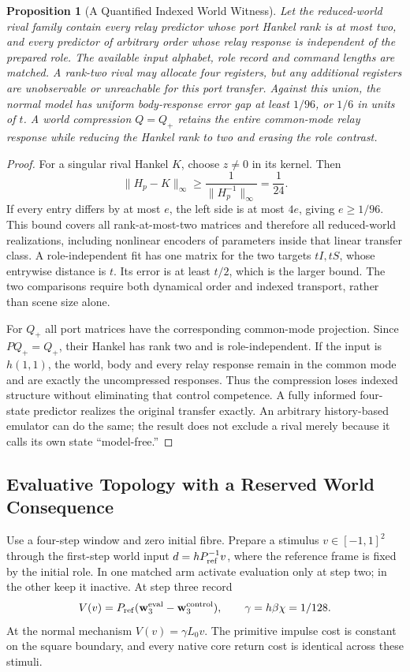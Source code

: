 \documentclass[11pt,a4paper]{article}
\newtheorem{proposition}[theorem]{Proposition}
\theoremstyle{definition}
\begin{document}
\begin{proposition}[A Quantified Indexed World Witness]\label{prop:bridge-indexed-world}
Let the reduced-world rival family contain every relay predictor whose port Hankel rank is at most two, and every predictor of arbitrary order whose relay response is independent of the prepared role. The available input alphabet, role record and command lengths are matched. A rank-two rival may allocate four registers, but any additional registers are unobservable or unreachable for this port transfer. Against this union, the normal model has uniform body-response error gap at least $1/96$, or $1/6$ in units of $t$. A world compression $Q=Q_+$ retains the entire common-mode relay response while reducing the Hankel rank to two and erasing the role contrast.
\end{proposition}
\begin{proof}
For a singular rival Hankel $K$, choose $z\ne0$ in its kernel. Then
\[
 \|H_p-K\|_\infty\ge\frac1{\|H_p^{-1}\|_\infty}=\frac1{24}.
\]
If every entry differs by at most $e$, the left side is at most $4e$, giving $e\ge1/96$. This bound covers all rank-at-most-two matrices and therefore all reduced-world realizations, including nonlinear encoders of parameters inside that linear transfer class. A role-independent fit has one matrix for the two targets $tI,tS$, whose entrywise distance is $t$. Its error is at least $t/2$, which is the larger bound. The two comparisons require both dynamical order and indexed transport, rather than scene size alone.

For $Q_+$ all port matrices have the corresponding common-mode projection. Since $P Q_+=Q_+$, their Hankel has rank two and is role-independent. If the input is $h(1,1)$, the world, body and every relay response remain in the common mode and are exactly the uncompressed responses. Thus the compression loses indexed structure without eliminating that control competence. A fully informed four-state predictor realizes the original transfer exactly. An arbitrary history-based emulator can do the same; the result does not exclude a rival merely because it calls its own state ``model-free.''
\end{proof}

\subsection{Evaluative Topology with a Reserved World Consequence}

Use a four-step window and zero initial fibre. Prepare a stimulus $v\in[-1,1]^2$ through the first-step world input $d=hP_{\rm ref}^{-1}v$, where the reference frame is fixed by the initial role. In one matched arm activate evaluation only at step two; in the other keep it inactive. At step three record
\[
 V(v)=P_{\rm ref}(\mathbf w_3^{\rm eval}-\mathbf w_3^{\rm control}),
 \qquad \gamma=h\beta\chi=1/128.
\]
At the normal mechanism $V(v)=\gamma L_0v$. The primitive impulse cost is constant on the square boundary, and every native core return cost is identical across these stimuli.
\end{document}
